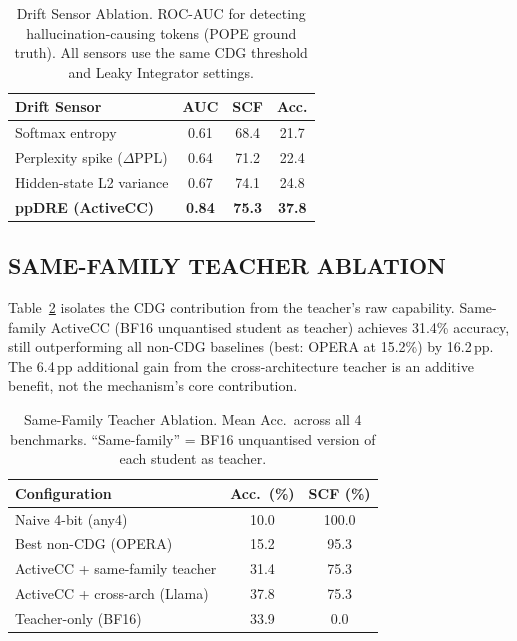 \documentclass{ieeetmlcn}
\begin{document}
\begin{table}[htbp]
\caption{Drift Sensor Ablation. ROC-AUC for detecting hallucination-causing tokens (POPE ground truth). All sensors use the same CDG threshold and Leaky Integrator settings.}
\label{tab:sensor}
\centering
\begin{tabular}{p{3.8cm}ccc}
\toprule
\textbf{Drift Sensor} & \textbf{AUC} & \textbf{SCF} & \textbf{Acc.} \\
\midrule
Softmax entropy          & 0.61 & 68.4 & 21.7 \\
Perplexity spike ($\Delta$PPL)  & 0.64 & 71.2 & 22.4 \\
Hidden-state L2 variance & 0.67 & 74.1 & 24.8 \\
\textbf{ppDRE (ActiveCC)} & \textbf{0.84} & \textbf{75.3} & \textbf{37.8} \\
\bottomrule
\end{tabular}
\end{table}

\subsection{SAME-FAMILY TEACHER ABLATION}
\label{sec:ablation}
Table~\ref{tab:ablation} isolates the CDG contribution from the
teacher's raw capability. Same-family ActiveCC (BF16 unquantised student
as teacher) achieves 31.4\% accuracy, still outperforming all non-CDG
baselines (best: OPERA at 15.2\%) by 16.2\,pp. The 6.4\,pp additional
gain from the cross-architecture teacher is an additive benefit, not the
mechanism's core contribution.

\begin{table}[htbp]
\caption{Same-Family Teacher Ablation. Mean Acc.\ across all 4 benchmarks. ``Same-family'' = BF16 unquantised version of each student as teacher.}
\label{tab:ablation}
\centering
\begin{tabular}{p{4.5cm}cc}
\toprule
\textbf{Configuration} & \textbf{Acc.\ (\%)} & \textbf{SCF (\%)} \\
\midrule
Naive 4-bit (any4)             & 10.0 & 100.0 \\
Best non-CDG (OPERA)           & 15.2 &  95.3 \\
ActiveCC + same-family teacher & 31.4 &  75.3 \\
ActiveCC + cross-arch (Llama)  & 37.8 &  75.3 \\
Teacher-only (BF16)            & 33.9 &   0.0 \\
\bottomrule
\end{tabular}
\end{table}
\end{document}
